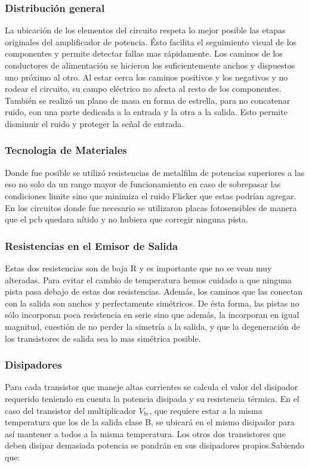 \subsubsection*{Distribución general}
La ubicación de los elementos del circuito respeta lo mejor posible las etapas originales del amplificador de potencia. Ésto facilita el seguimiento visual de los componentes y permite detectar fallas mas rápidamente.
Los caminos de los conductores de alimentación se hicieron los suficientemente anchos y dispuestos uno próximo al otro. Al estar cerca los caminos positivos y los negativos y no rodear el circuito, su campo eléctrico no afecta al resto de los componentes.
También se realizó un plano de masa en forma de estrella, para no concatenar ruido, con una parte dedicada a la entrada y la otra a la salida. Esto permite disminuir el ruido y proteger la señal de entrada.
\bigskip
\subsubsection*{Tecnologia de Materiales}

Donde fue posible se utilizó resistencias de metalfilm de potencias superiores a las eso no solo da un rango mayor de funcionamiento en caso de sobrepasar las condiciones limite sino que minimiza el ruido Flicker que estas podrían agregar.
En los circuitos donde fue necesario se utilizaron placas fotosensibles de manera que el pcb quedara nítido y no hubiera que corregir ninguna pista.

\bigskip
\subsubsection*{Resistencias en el Emisor de Salida}
Estas dos resistencias son de baja R y es importante que no se vean muy alteradas. Para evitar el cambio de temperatura hemos cuidado a que ninguna pista pasa debajo de estas dos resistencias. Además, los caminos que las conectan con la salida son anchos y perfectamente simétricos. De ésta forma, las pistas no sólo incorporan poca resistencia en serie sino que además, la incorporan en igual magnitud, cuestión de no perder la simetría a la salida, y que la degeneración de los transistores de salida sea lo mas simétrica posible.
\bigskip

\subsubsection{Disipadores}

Para cada transistor que maneje altas corrientes se calcula el valor del disipador requerido teniendo en cuenta la potencia disipada y su resistencia térmica. En el caso del transistor del multiplicador $V_{be}$, que requiere estar a la misma temperatura que los de la salida clase B, se ubicará en el mismo disipador para así mantener a todos a la misma temperatura. Los otros dos transistores que deben disipar demasiada potencia se pondrán en sus disipadores propios.Sabiendo que:

